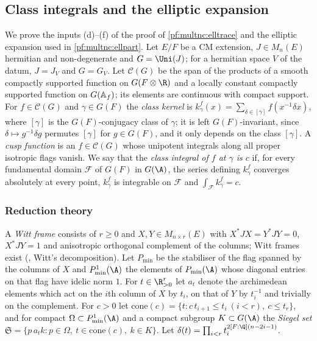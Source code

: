 \subsection{Class integrals and the elliptic expansion}\label{pf:multnc:sec-classint}

We prove the inputs (d)--(f) of the proof of \cref{pf:multnc:elltrace} and the elliptic expansion used in
\cref{pf:multnc:ellpart}. Let $E/F$ be a CM extension, $J\in M_n(E)$ hermitian and non-degenerate and $G=\Uni(J)$; for a
hermitian space $V$ of the datum, $J=J_V$ and $G=G_V$. Let $\mathcal C(G)$ be the span of the products of a smooth compactly
supported function on $G(F\otimes\R)$ and a locally constant compactly supported function on $G(\mathbb{A}_{f})$; its elements
are continuous with compact support. For $f\in\mathcal C(G)$ and
$\gamma\in G(F)$ the \emph{class kernel} is $k^f_\gamma(x)=\sum_{\delta\in[\gamma]}f(x^{-1}\delta x)$, where $[\gamma]$ is the
$G(F)$-conjugacy class of $\gamma$; it is left $G(F)$-invariant, since $\delta\mapsto g^{-1}\delta g$ permutes $[\gamma]$ for
$g\in G(F)$, and it only depends on the class $[\gamma]$. A \emph{cusp function} is an $f\in\mathcal C(G)$ whose unipotent integrals along all proper
isotropic flags vanish. We say that the \emph{class integral of $f$ at $\gamma$ is $c$} if, for every fundamental domain
$\mathcal F$ of $G(F)$ in $G(\A)$, the series defining $k^f_\gamma$ converges absolutely at every point, $k^f_\gamma$ is
integrable on $\mathcal F$ and $\int_{\mathcal F}k^f_\gamma=c$.

\subsubsection*{Reduction theory}

A \emph{Witt frame} consists of $r\ge0$ and $X,Y\in M_{n\times r}(E)$ with $X^*JX=Y^*JY=0$, $X^*JY=1$ and anisotropic
orthogonal complement of the columns; Witt frames exist (, Witt's
decomposition). Let $P_{\min}$ be the stabiliser of the flag spanned by the columns of $X$ and $P^1_{\min}(\A)$ the
elements of $P_{\min}(\A)$ whose diagonal entries on that flag have idelic norm $1$. For $t\in\R^r_{>0}$ let $a_t$ denote
the archimedean elements which act on the $i$th column of $X$ by $t_i$, on that of $Y$ by $t_i^{-1}$ and trivially on the
complement. For $c>0$ let $\mathrm{cone}(c)=\{t:c\,t_{i+1}\le t_i\ (i<r),\ c\le t_r\}$, and for compact $\Omega\subset
P^1_{\min}(\A)$ and a compact subgroup $K\subset G(\A)$ the \emph{Siegel set} $\mathfrak S=\{p\,a_tk:p\in\Omega,\ t\in
\mathrm{cone}(c),\ k\in K\}$. Let $\delta(t)=\prod_{i<r}t_i^{2[F:\Q](n-2i-1)}$.

